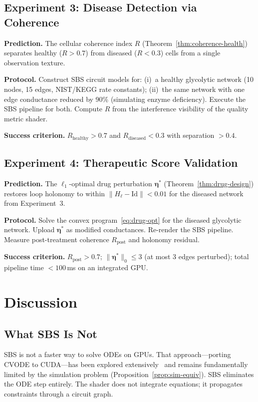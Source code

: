 \documentclass[11pt,twocolumn,a4paper]{article}
\begin{document}
\subsection{Experiment 3: Disease Detection via Coherence}

\textbf{Prediction.}  The cellular coherence index $R$
(Theorem~\ref{thm:coherence-health}) separates healthy ($R > 0.7$)
from diseased ($R < 0.3$) cells from a single observation texture.

\textbf{Protocol.}  Construct SBS circuit models for: (i)~a healthy
glycolytic network (10 nodes, 15 edges, NIST/KEGG rate constants);
(ii)~the same network with one edge conductance reduced by 90\%
(simulating enzyme deficiency).  Execute the SBS pipeline for both.
Compute $R$ from the interference visibility of the quality metric
shader.

\textbf{Success criterion.}  $R_{\mathrm{healthy}} > 0.7$ and
$R_{\mathrm{diseased}} < 0.3$ with separation $> 0.4$.

\subsection{Experiment 4: Therapeutic Score Validation}

\textbf{Prediction.}  The $\ell_1$-optimal drug perturbation
$\boldsymbol{\eta}^*$ (Theorem~\ref{thm:drug-design}) restores loop
holonomy to within $\|H_\ell - \mathrm{Id}\| < 0.01$ for the diseased
network from Experiment~3.

\textbf{Protocol.}  Solve the convex program~\eqref{eq:drug-opt} for
the diseased glycolytic network.  Upload $\boldsymbol{\eta}^*$ as
modified conductances.  Re-render the SBS pipeline.  Measure
post-treatment coherence $R_{\mathrm{post}}$ and holonomy residual.

\textbf{Success criterion.}  $R_{\mathrm{post}} > 0.7$;
$\|\boldsymbol{\eta}^*\|_0 \leq 3$ (at most 3 edges perturbed);
total pipeline time $< 100$\,ms on an integrated GPU.


\section{Discussion}
\label{sec:discussion}

\subsection{What SBS Is Not}

SBS is not a faster way to solve ODEs on GPUs.  That approach---porting
CVODE to CUDA---has been explored extensively~\citep{owens2008,
nickolls2008} and remains fundamentally limited by the simulation
problem (Proposition~\ref{prop:sim-equiv}).  SBS eliminates the ODE
step entirely.  The shader does not integrate equations; it propagates
constraints through a circuit graph.
\end{document}
